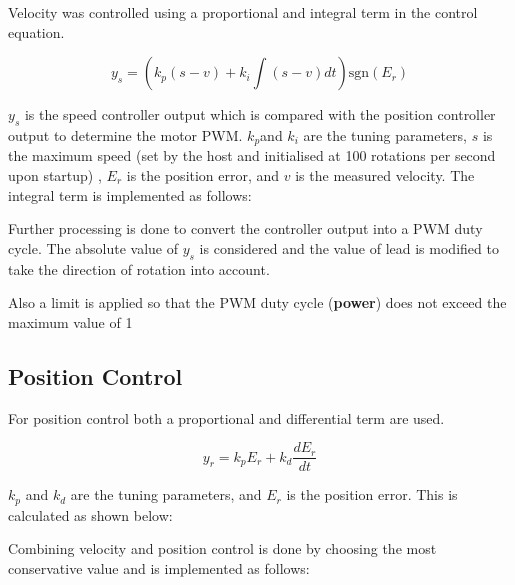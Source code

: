 \documentclass{article}
\begin{document}
\noindent
Velocity was controlled using a proportional and integral term in the control equation.

\[ y_s = \left( k_p(s-v)+ k_i\int(s-v)dt\right)\textrm{sgn}(E_r)\]

\noindent
\(y_s\) is the speed controller output which is compared with the position controller output to determine the motor PWM. \(k_p\)and \(k_i\) are the tuning parameters, \(s\) is the maximum speed (set by the host and initialised at 100 rotations per second upon startup) , \(E_r\) is the position error, and \(v\) is the measured velocity. The integral term is implemented as follows:

\bigskip




\bigskip

\noindent
Further processing is done to convert the controller output into a PWM duty cycle. The absolute value of \(y_s\) is considered and the value of lead is modified to take the direction of rotation into account.

\bigskip



\bigskip

\noindent
Also a limit is applied so that the PWM duty cycle (\textbf{power}) does not exceed the maximum value of 1

\bigskip



\bigskip

\subsection{Position Control}

\noindent
For position control both a proportional and differential term are used.

\[y_r = k_pE_r + k_d \frac{dE_r}{dt}\]

\(k_p\) and \(k_d\) are the tuning parameters, and \(E_r\) is the position error. This is calculated as shown below:

\bigskip

\bigskip

\noindent
Combining velocity and position control is done by choosing the most conservative value and is implemented as follows:

\bigskip

\bigskip
\end{document}
